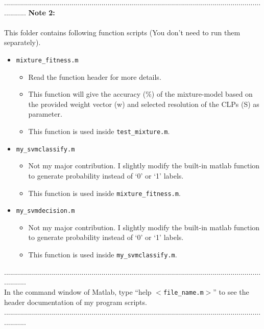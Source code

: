 \documentclass[a4paper,12pt]{article} %
\begin{document}
............................................................................................................................................
\textbf{Note 2: }\\\\
This folder contains following function scripts (You don't need to run them separately).
\begin{itemize}
	
	\item \verb|mixture_fitness.m|
	\begin{itemize}
		\item Read the function header for more details.
		\item This function will give the accuracy (\%) of the mixture-model based on the provided weight vector (w) and selected resolution of the CLPs (S) as parameter. 
		\item This function is used inside \verb|test_mixture.m|. 

	\end{itemize}

	\item \verb|my_svmclassify.m|
	\begin{itemize}
		\item Not my major contribution. I slightly modify the built-in matlab function to generate probability instead of `0' or `1' labels. 
		\item This function is used inside \verb|mixture_fitness.m|.
	\end{itemize}
	\item \verb|my_svmdecision.m|
	\begin{itemize}
		\item Not my major contribution. I slightly modify the built-in matlab function to generate probability instead of `0' or `1' labels. 
		\item This function is used inside \verb|my_svmclassify.m|.
	\end{itemize}
	
\end{itemize}
............................................................................................................................................\\
In the command window of Matlab, type ``help $<$\verb|file_name.m|$>$'' to see the header documentation of my program scripts.\\
............................................................................................................................................
\end{document}
